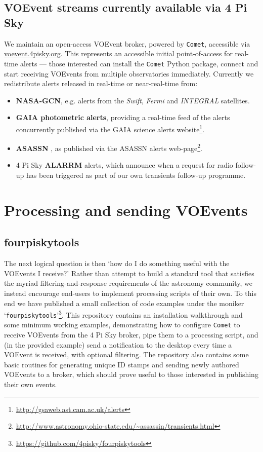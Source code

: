 \documentclass[5p,authoryear]{elsarticle}
\begin{document}
\subsection{VOEvent streams currently available via 4 Pi Sky}
We maintain an open-access VOEvent broker, powered by \texttt{Comet}, accessible via \\\mbox{\url{voevent.4pisky.org}}.
This represents an accessible initial point-of-access for real-time alerts --- those interested can install the \texttt{Comet} Python package, connect and start receiving VOEvents from multiple observatories immediately. 
Currently we redistribute alerts released in real-time or near-real-time from:
\begin{itemize}
 \item \textbf{NASA-GCN}, e.g. alerts from the \textit{Swift}, \textit{Fermi} and \textit{INTEGRAL} satellites.
 \item \textbf{GAIA photometric alerts}, providing a real-time feed of the alerts concurrently published via the GAIA science alerts website\footnote{\url{http://gsaweb.ast.cam.ac.uk/alerts}}.
 \item \textbf{ASASSN} \citep{Shappee2014}, as published via the ASASSN alerts web-page\footnote{\url{http://www.astronomy.ohio-state.edu/~assassin/transients.html}}.
 \item 4 Pi Sky \textbf{ALARRM} alerts, which announce when a request for radio follow-up has been triggered as part of our own transients follow-up programme.
\end{itemize}


\section{Processing and sending VOEvents}
\subsection{fourpiskytools}
The next logical question is then `how do I do something useful with the VOEvents I receive?'
Rather than attempt to build a standard tool that satisfies the myriad filtering-and-response requirements of the astronomy community, we instead encourage end-users to implement processing scripts of their own. 
To this end we have published a small collection of code examples under the moniker `\texttt{fourpiskytools}'\footnote{\url{https://github.com/4pisky/fourpiskytools}}. 
This repository contains an installation walkthrough and some minimum working examples,  demonstrating how to configure \texttt{Comet} to receive VOEvents from the 4 Pi Sky broker, pipe them to a processing script, and (in the provided example) send a notification to the desktop every time a VOEvent is received, with optional filtering.
The repository also contains some basic routines for generating unique ID stamps and sending newly authored VOEvents to a broker, which should prove useful to those interested in publishing their own events.
\end{document}
